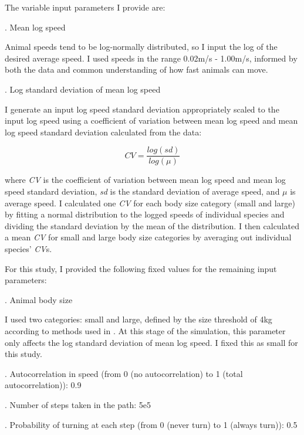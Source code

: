 \documentclass[a4paper,12pt,twoside]{report}
\begin{document}
\noindent The variable input parameters I provide are:
\medskip

. Mean log speed
\medskip

\noindent Animal speeds tend to be log-normally distributed, so I input the log of the desired average speed. I used speeds in the range 0.02m/s - 1.00m/s, informed by both the data and common understanding of how fast animals can move. 
\medskip

. Log standard deviation of mean log speed
\medskip

\noindent I generate an input log speed standard deviation appropriately scaled to the input log speed using a coefficient of variation between mean log speed and mean log speed standard deviation calculated from the data:

\begin{equation}
	CV = \frac{log(sd)}{log(\mu)}
\end{equation}

\noindent where \textit{CV} is the coefficient of variation between mean log speed and mean log speed standard deviation, \textit{sd} is the standard deviation of average speed, and \begin{math}\mu\end{math} is average speed. I calculated one \textit{CV} for each body size category (small and large) by fitting a normal distribution to the logged speeds of individual species and dividing the standard deviation by the mean of the distribution. I then calculated a mean \textit{CV} for small and large body size categories by averaging out individual species' \textit{CV}s.
\medskip

\noindent For this study, I provided the following fixed values for the remaining input parameters:
\medskip

. Animal body size
\medskip

\noindent I used two categories: small and large, defined by the size threshold of 4kg according to methods used in \cite{marcus2011quantifying}. At this stage of the simulation, this parameter only affects the log standard deviation of mean log speed. I fixed this as small for this study. 
\medskip

. Autocorrelation in speed (from 0 (no autocorrelation) to 1 (total autocorrelation)): 0.9
\medskip

. Number of steps taken in the path: 5e5
\medskip

. Probability of turning at each step (from 0 (never turn) to 1 (always turn)): 0.5
\medskip
\end{document}
